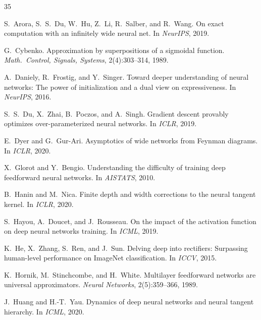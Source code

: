 \documentclass[10pt]{article}
\theoremstyle{definition}
\begin{document}
\begin{thebibliography}{35}

S.~Arora, S.~S.~Du, W.~Hu, Z.~Li, R.~Salber, and R.~Wang.
\newblock On exact computation with an infinitely wide neural net.
\newblock In \emph{NeurIPS}, 2019.

G.~Cybenko.
\newblock Approximation by superpositions of a sigmoidal function.
\newblock \emph{Math.\ Control, Signals, Systems}, 2(4):303--314, 1989.

A.~Daniely, R.~Frostig, and Y.~Singer.
\newblock Toward deeper understanding of neural networks: The power of initialization and a dual view on expressiveness.
\newblock In \emph{NeurIPS}, 2016.

S.~S.~Du, X.~Zhai, B.~Poczos, and A.~Singh.
\newblock Gradient descent provably optimizes over-parameterized neural networks.
\newblock In \emph{ICLR}, 2019.

E.~Dyer and G.~Gur-Ari.
\newblock Asymptotics of wide networks from Feynman diagrams.
\newblock In \emph{ICLR}, 2020.

X.~Glorot and Y.~Bengio.
\newblock Understanding the difficulty of training deep feedforward neural networks.
\newblock In \emph{AISTATS}, 2010.

B.~Hanin and M.~Nica.
\newblock Finite depth and width corrections to the neural tangent kernel.
\newblock In \emph{ICLR}, 2020.

S.~Hayou, A.~Doucet, and J.~Rousseau.
\newblock On the impact of the activation function on deep neural networks training.
\newblock In \emph{ICML}, 2019.

K.~He, X.~Zhang, S.~Ren, and J.~Sun.
\newblock Delving deep into rectifiers: Surpassing human-level performance on ImageNet classification.
\newblock In \emph{ICCV}, 2015.

K.~Hornik, M.~Stinchcombe, and H.~White.
\newblock Multilayer feedforward networks are universal approximators.
\newblock \emph{Neural Networks}, 2(5):359--366, 1989.

J.~Huang and H.-T.~Yau.
\newblock Dynamics of deep neural networks and neural tangent hierarchy.
\newblock In \emph{ICML}, 2020.


\end{thebibliography}
\end{document}
